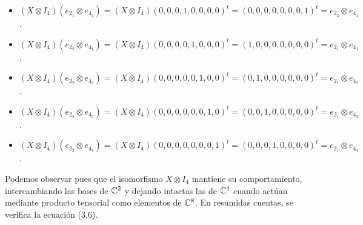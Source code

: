 \begin{example}
\begin{itemize}
\item $(X\otimes I_4)(e_{2_1}\otimes e_{4_4})=(X\otimes I_4)(0,0,0,1,0,0,0,0)^t=(0,0,0,0,0,0,0,1)^t = e_{2_2}\otimes e_{4_4}$.
\item $(X\otimes I_4)(e_{2_2}\otimes e_{4_1})=(X\otimes I_4)(0,0,0,0,1,0,0,0)^t=(1,0,0,0,0,0,0,0)^t = e_{2_1}\otimes e_{4_1}$.
\item $(X\otimes I_4)(e_{2_2}\otimes e_{4_2})=(X\otimes I_4)(0,0,0,0,0,1,0,0)^t=(0,1,0,0,0,0,0,0)^t = e_{2_1}\otimes e_{4_2}$.
\item $(X\otimes I_4)(e_{2_2}\otimes e_{4_3})=(X\otimes I_4)(0,0,0,0,0,0,1,0)^t=(0,0,1,0,0,0,0,0)^t = e_{2_1}\otimes e_{4_3}$.
\item $(X\otimes I_4)(e_{2_2}\otimes e_{4_4})=(X\otimes I_4)(0,0,0,0,0,0,0,1)^t=(0,0,0,1,0,0,0,0)^t = e_{2_1}\otimes e_{4_4}$.
\end{itemize}

Podemos observar pues que el isomorfismo $X\otimes I_4$ mantiene su comportamiento, intercambiando las bases de $\mathbb{C}^2$ y dejando intactas las de $\mathbb{C}^4$ cuando actúan mediante producto tensorial como elementos de $\mathbb{C}^8$. En resumidas cuentas, se verifica la ecuación (3.6).
\end{example}